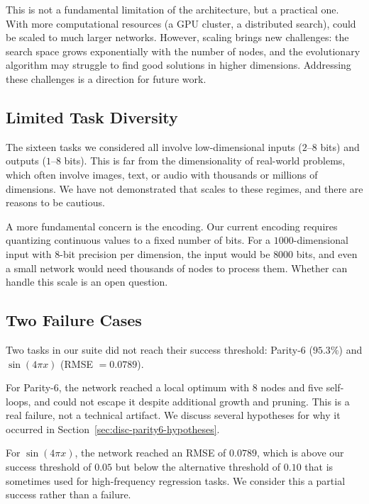 This is not a fundamental limitation of the architecture, but a
practical one. With more computational resources (a GPU cluster, a
distributed search), \modnet{} could be scaled to much larger networks.
However, scaling brings new challenges: the search space grows
exponentially with the number of nodes, and the evolutionary algorithm
may struggle to find good solutions in higher dimensions. Addressing
these challenges is a direction for future work.

\subsection{Limited Task Diversity}
\label{sec:disc-tasks}

The sixteen tasks we considered all involve low-dimensional inputs
($2$--$8$ bits) and outputs ($1$--$8$ bits). This is far from the
dimensionality of real-world problems, which often involve images,
text, or audio with thousands or millions of dimensions. We have not
demonstrated that \modnet{} scales to these regimes, and there are
reasons to be cautious.

A more fundamental concern is the encoding. Our current encoding
requires quantizing continuous values to a fixed number of bits. For a
$1000$-dimensional input with $8$-bit precision per dimension, the
input would be $8000$ bits, and even a small network would need
thousands of nodes to process them. Whether \modnet{} can handle this
scale is an open question.

\subsection{Two Failure Cases}
\label{sec:disc-failures}

Two tasks in our suite did not reach their success threshold:
Parity-6 ($95.3\%$) and $\sin(4\pi x)$ (RMSE $= 0.0789$).

For Parity-6, the network reached a local optimum with $8$ nodes and
five self-loops, and could not escape it despite additional growth and
pruning. This is a real failure, not a technical artifact. We discuss
several hypotheses for why it occurred in
Section~\ref{sec:disc-parity6-hypotheses}.

For $\sin(4\pi x)$, the network reached an RMSE of $0.0789$, which is
above our success threshold of $0.05$ but below the alternative
threshold of $0.10$ that is sometimes used for high-frequency
regression tasks. We consider this a partial success rather than a
failure.

